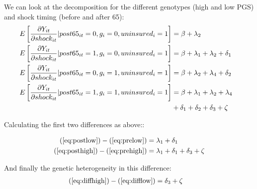 We can look at the decomposition for the different genotypes (high and low PGS) and shock timing (before and after 65):
\begin{align}
\phantom{E\left[ \frac{\partial Y_{it}}{\partial shock_{it}}| post65_{it}=1, g_i=1,uninsured_i=1\right]}%
%
%
&\begin{aligned}
\mathllap{E\left[ \frac{\partial Y_{it}}{\partial shock_{it}}| post65_{it}=0, g_i=0,uninsured_i=1\right]} &=\beta+\lambda_2
\end{aligned}
\label{eq:prelow} \\
&\begin{aligned}
\mathllap{E\left[ \frac{\partial Y_{it}}{\partial shock_{it}}| post65_{it}=1, g_i=0,uninsured_i=1\right]} &=\beta+\lambda_1+\lambda_2+\delta_1
\end{aligned}
\label{eq:postlow} \\
&\begin{aligned}
\mathllap{E\left[ \frac{\partial Y_{it}}{\partial shock_{it}}| post65_{it}=0, g_i=1,uninsured_i=1\right]} &=\beta+\lambda_2+\lambda_4+\delta_2
\end{aligned}
\label{eq:prehigh} \\
&\begin{aligned}
\mathllap{E\left[ \frac{\partial Y_{it}}{\partial shock_{it}}| post65_{it}=1, g_i=1,uninsured_i=1\right]} &=\beta+\lambda_1+\lambda_2+\lambda_4\\
&+\delta_1+\delta_2+\delta_3+\zeta
\end{aligned}
\label{eq:posthigh}
\end{align}

Calculating the first two differences as above::

\begin{align}
(\ref{eq:postlow})-(\ref{eq:prelow})&=\lambda_1+\delta_1
\label{eq:difflow}\\
(\ref{eq:posthigh})-(\ref{eq:prehigh})&=\lambda_1+\delta_1+\delta_3+\zeta
\label{eq:diffhigh}
\end{align}

And finally the genetic heterogeneity in this difference:
\begin{align}
(\ref{eq:diffhigh})-(\ref{eq:difflow})&=\delta_3+\zeta
\end{align}


